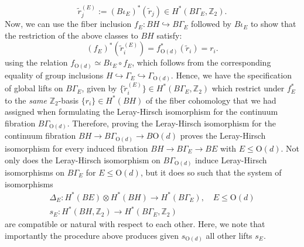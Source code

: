 \documentclass[aps,prx,reprint,superscriptaddress,twocolumn,amsmath,amssymb,amsfonts, nofootinbib]{revtex4-2}
\newcommand{\Z}{\mathbb{Z}}
\theoremstyle{apsstyle}
\begin{document}
\begin{equation*}
    \widetilde{r}_{j}^{(E)}:=(B\iota_{E})^{*}(\widetilde{r}_{j})\in H^{*}(B\Gamma_{E}, \Z_{2}).
\end{equation*}
Now, we can use the fiber inclusion $f_{E}: BH\hookrightarrow B\Gamma_{E}$  followed by $B\iota_{E}$ to show that the restriction of the above classes to $BH$ satisfy:
\begin{equation*}
    (f_{E})^{*}\left(\widetilde{r}^{(E)}_{i}\right) = f_{\mathrm{O}(d)}^{*}(\widetilde{r}_{i})= r_{i}.
\end{equation*}
using the relation $f_{\mathrm O(d)}\simeq B\iota_E\circ f_E$,
which follows from the corresponding equality of group inclusions
$H\hookrightarrow\Gamma_E\hookrightarrow\Gamma_{\mathrm O(d)}$. Hence, we have the specification of global lifts on $B\Gamma_{E}$, given by $\{\widetilde{r}_{i}^{(E)}\}\in H^{*}(B\Gamma_{E},\Z_{2})$ which restrict under $f_{E}^{*}$ to the \textit{same} $\Z_{2}$-basis $\{r_{i}\}\in H^{*}(BH)$ of the fiber cohomology that we had assigned when formulating the Leray-Hirsch isomorphism for the continuum fibration $B\Gamma_{\mathrm{O}(d)}$. Therefore, proving the Leray-Hirsch isomorphism for the continuum fibration $BH \to B\Gamma_{\mathrm{O}(d)} \to B\mathrm{O}(d)$ proves the Leray-Hirsch isomorphism for every induced fibration $BH \to B\Gamma_{E} \to BE$ with $E\leq \mathrm{O}(d)$. Not only does the Leray-Hirsch isomorphism on $B\Gamma_{\mathrm{O}(d)}$ induce Leray-Hirsch isomorphisms on $B\Gamma_{E}$ for $E\leq \mathrm{O}(d)$, but it does so such that the system of isomorphisms
\begin{gather}
    \label{eq:LH_BE}
    \Delta_{E}: H^{*}(BE)\otimes H^{*}(BH) \to H^{*}(B\Gamma_{E}),\quad E\leq \mathrm{O}(d)\\
    s_{E}:  H^{*}(BH,\Z_{2}) \to H^{*}(B\Gamma_{E}, \Z_{2})\nonumber
\end{gather}
are compatible or natural with respect to each other. Here, we note that importantly the procedure above produces given $s_{\mathrm{O}(d)}$ all other lifts $s_{E}$. 

\bigskip 
\end{document}
